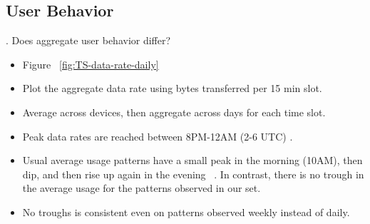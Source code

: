 \subsection{User Behavior}
\label{subsec:behavior}

. Does aggregate user behavior differ?


\begin{itemize}
\itemsep0em 
\item Figure ~\ref{fig:TS-data-rate-daily}
\item Plot the aggregate data rate using bytes transferred per 15 min slot. 
\item Average across devices, then aggregate across days for each time slot.
\item Peak data rates are reached between 8PM-12AM (2-6 UTC) .
\item Usual average usage patterns have a small peak in the morning (10AM), then dip, and then rise up again in the evening ~\cite{sandvine2014report1}. In contrast, there is no trough in the average usage for the patterns observed in our set.
\item No troughs is consistent even on patterns observed weekly instead of daily.
\end{itemize}


